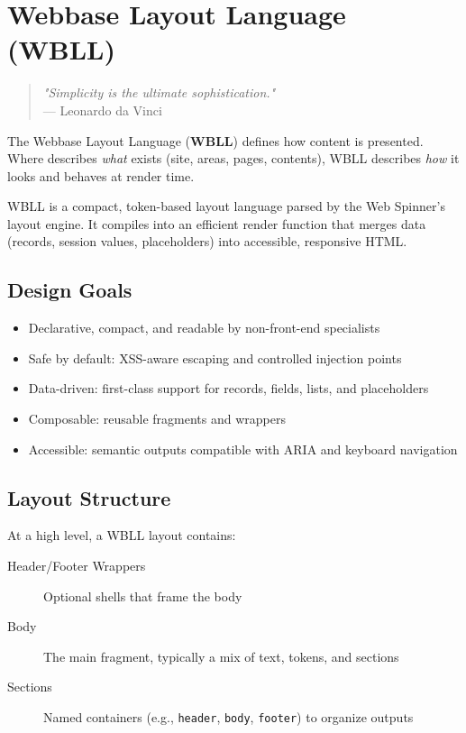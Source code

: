 
\chapter{Webbase Layout Language (WBLL)}
\label{chap:wbll}

\begin{quote}
\textit{"Simplicity is the ultimate sophistication."} \\
— Leonardo da Vinci
\end{quote}

The Webbase Layout Language (\textbf{WBLL}) defines how content is presented. Where \wbdl{} describes \textit{what} exists (site, areas, pages, contents), WBLL describes \textit{how} it looks and behaves at render time.

WBLL is a compact, token-based layout language parsed by the Web Spinner’s layout engine. It compiles into an efficient render function that merges data (records, session values, placeholders) into accessible, responsive HTML.

\section{Design Goals}
\label{sec:wbll-goals}

\begin{itemize}
	\item Declarative, compact, and readable by non-front-end specialists
	\item Safe by default: XSS-aware escaping and controlled injection points
	\item Data-driven: first-class support for records, fields, lists, and placeholders
	\item Composable: reusable fragments and wrappers
	\item Accessible: semantic outputs compatible with ARIA and keyboard navigation
\end{itemize}

\section{Layout Structure}
\label{sec:wbll-structure}

At a high level, a WBLL layout contains:

\begin{description}
	\item[Header/Footer Wrappers] Optional shells that frame the body
	\item[Body] The main fragment, typically a mix of text, tokens, and sections
	\item[Sections] Named containers (e.g., \texttt{header}, \texttt{body}, \texttt{footer}) to organize outputs
\end{description}

